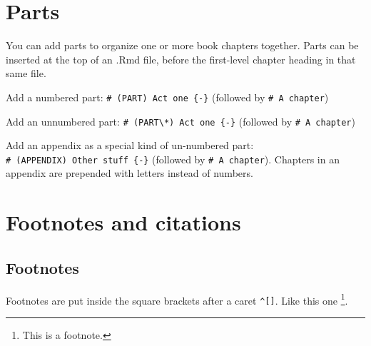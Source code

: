 \documentclass[
]{book}
\newenvironment{Shaded}{\begin{snugshade}}{\end{snugshade}}
\newcommand{\AttributeTok}[1]{\textcolor[rgb]{0.77,0.63,0.00}{#1}}
\newcommand{\CommentTok}[1]{\textcolor[rgb]{0.56,0.35,0.01}{\textit{#1}}}
\newcommand{\DecValTok}[1]{\textcolor[rgb]{0.00,0.00,0.81}{#1}}
\newcommand{\DocumentationTok}[1]{\textcolor[rgb]{0.56,0.35,0.01}{\textbf{\textit{#1}}}}
\newcommand{\FunctionTok}[1]{\textcolor[rgb]{0.00,0.00,0.00}{#1}}
\newcommand{\NormalTok}[1]{#1}
\newcommand{\SpecialCharTok}[1]{\textcolor[rgb]{0.00,0.00,0.00}{#1}}
\theoremstyle{definition}
\theoremstyle{definition}
\theoremstyle{definition}
\theoremstyle{definition}
\theoremstyle{remark}
\begin{document}
\begin{Shaded}
\end{Shaded}

\hypertarget{parts}{%
\chapter{Parts}\label{parts}}

You can add parts to organize one or more book chapters together. Parts can be inserted at the top of an .Rmd file, before the first-level chapter heading in that same file.

Add a numbered part: \texttt{\#\ (PART)\ Act\ one\ \{-\}} (followed by \texttt{\#\ A\ chapter})

Add an unnumbered part: \texttt{\#\ (PART\textbackslash{}*)\ Act\ one\ \{-\}} (followed by \texttt{\#\ A\ chapter})

Add an appendix as a special kind of un-numbered part: \texttt{\#\ (APPENDIX)\ Other\ stuff\ \{-\}} (followed by \texttt{\#\ A\ chapter}). Chapters in an appendix are prepended with letters instead of numbers.

\hypertarget{footnotes-and-citations}{%
\chapter{Footnotes and citations}\label{footnotes-and-citations}}

\hypertarget{footnotes}{%
\section{Footnotes}\label{footnotes}}

Footnotes are put inside the square brackets after a caret \texttt{\^{}{[}{]}}. Like this one \footnote{This is a footnote.}.
\end{document}
